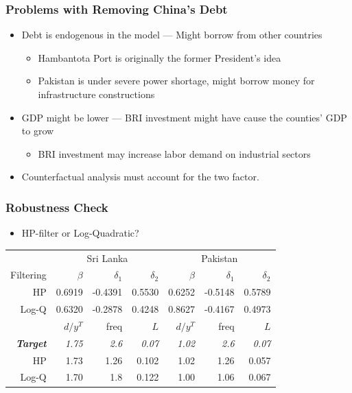 \documentclass[mathserif]{beamer}
\begin{document}
    \begin{frame}
        \frametitle{Problems with Removing China's Debt}

        \begin{itemize}
            \item Debt is endogenous in the model --- Might borrow from other countries
            \begin{itemize}
                \item Hambantota Port is originally the former President's idea
                \item Pakistan is under severe power shortage, might borrow money for infrastructure constructions
            \end{itemize}
            \item GDP might be lower --- BRI investment might have cause the counties' GDP to grow
            \begin{itemize}
                \item BRI investment may increase labor demand on industrial sectors
            \end{itemize}
            \item Counterfactual analysis must account for the two factor.
        \end{itemize}
    
        
    
    \end{frame}

    \begin{frame}
        \frametitle{Robustness Check}
    
        \begin{itemize}
            \item HP-filter or Log-Quadratic?
        \end{itemize}

        \begin{tabular}{@{}rrrrrrr@{}}
        \toprule
        \multicolumn{1}{c}{} & \multicolumn{3}{c}{Sri Lanka} & \multicolumn{3}{c}{Pakistan} \\ \cmidrule(l){2-7}
        Filtering &
        $\beta$ &
        $\delta_1$ &
        $\delta_2$ &
        $\beta$ &
        $\delta_1$ &
        $\delta_2$\\
        \midrule
        HP &    0.6919 &  -0.4391  &  0.5530 &  0.6252 &  -0.5148  &   0.5789 \\
        Log-Q &0.6320  & -0.2878  &  0.4248  &   0.8627   & -0.4167    & 0.4973\\  \midrule
        &
        $d/y^T$ &
        freq &
        $L$ &
        $d/y^T$ &
        freq &
        $L$ \\
        \midrule
        \textbf{\emph{Target}} &
    \emph{ 1.75} &\emph{ 2.6} &\emph{ 0.07} &\emph{ 1.02} &\emph{ 2.6} &\emph{ 0.07} \\
        HP &  1.73 &	1.26 & 0.102 & 1.02 & 1.26 & 0.057\\
        Log-Q & 1.70 & 1.8 & 0.122 & 1.00 & 1.06 & 0.067\\
        \bottomrule

        \end{tabular}
    \end{frame}
\end{document}
